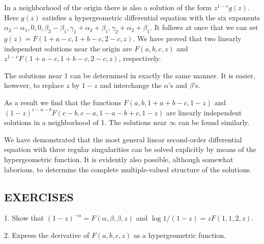 In a neighborhood of the origin there is also a solution of the form $z^{1-c}g(z)$. Here $g(z)$ satisfies a hypergeometric differential equation with the six exponents $\alpha_{2}-\alpha_{1},0,0,\beta_{2}-\beta_{1},\gamma_{1}+\alpha_{2}+\beta_{1},\gamma_{2}+\alpha_{2}+\beta_{1}$. It follows at once that we can set $g(z)=F(1+a-c,1+b-c,2-c,z)$. We have proved that two linearly independent solutions near the origin are $F(a,b,c,z)$ and $z^{1-c}F(1+a-c,1+b-c,2-c,z)$, respectively.

The solutions near 1 can be determined in exactly the same manner. It is easier, however, to replace $z$ by $1 - z$ and interchange the $\alpha$'s and $\beta$'s.


As a result we find that the functions $F(a,b,1+a+b-c,1-z)$ and $(1-z)^{c-a-b}F(c-b,c-a,1-a-b+c,1-z)$ are linearly independent solutions in a neighborhood of 1. The solutions near $\infty$ can be found similarly.

We have demonstrated that the most general linear second-order differential equation with three regular singularities can be solved explicitly by means of the hypergeometric function. It is evidently also possible, although somewhat laborious, to determine the complete multiple-valued structure of the solutions.

\subsection*{EXERCISES}
1. Show that $(1 - z)^{-\alpha} = F(\alpha, \beta, \beta, z)$ and $\log 1 / (1 - z) = zF(1, 1, 2, z)$.

2. Express the derivative of $F(a,b,c,z)$ as a hypergeometric function.

